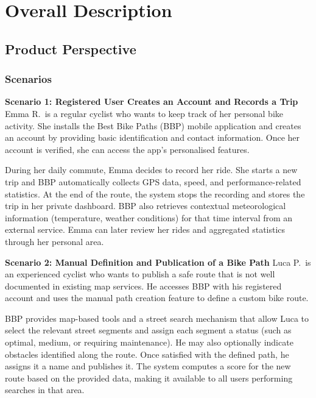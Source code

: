 \chapter{Overall Description}
\label{chap:overall_description}%

\section{Product Perspective}
\label{sec:product_perspective}%

\subsection{Scenarios}
\label{sub:scenarios}%

\par{\textbf{Scenario 1: Registered User Creates an Account and Records a Trip}}
Emma R.\ is a regular cyclist who wants to keep track of her personal bike activity. She installs the Best Bike Paths (BBP) mobile application and creates an account by providing basic identification and contact information. Once her account is verified, she can access the app’s personalised features.

During her daily commute, Emma decides to record her ride. She starts a new trip and BBP automatically collects GPS data, speed, and performance-related statistics. At the end of the route, the system stops the recording and stores the trip in her private dashboard. BBP also retrieves contextual meteorological information (temperature, weather conditions) for that time interval from an external service. Emma can later review her rides and aggregated statistics through her personal area.

\par{\textbf{Scenario 2: Manual Definition and Publication of a Bike Path}}
Luca P.\ is an experienced cyclist who wants to publish a safe route that is not well documented in existing map services. He accesses BBP with his registered account and uses the manual path creation feature to define a custom bike route.

BBP provides map-based tools and a street search mechanism that allow Luca to select the relevant street segments and assign each segment a status (such as optimal, medium, or requiring maintenance). He may also optionally indicate obstacles identified along the route. Once satisfied with the defined path, he assigns it a name and publishes it. The system computes a score for the new route based on the provided data, making it available to all users performing searches in that area.

